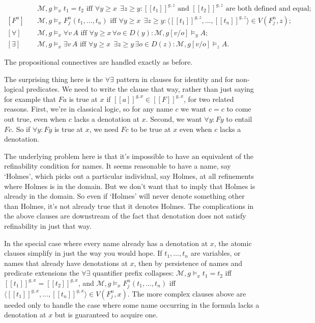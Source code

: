\documentclass[
  11pt,
  letterpaper,
  DIV=11,
  numbers=noendperiod,
  twoside]{scrartcl}
\newcommand{\llbracket}{[\![}
\newcommand{\rrbracket}{]\!]}
\begin{document}
\begin{align*}
[=] \quad & \mathcal{M}, g \models_x t_1 = t_2 \text{ iff } \forall y \geqslant x \;\, \exists z \geqslant y : \llbracket t_1 \rrbracket^{g,z} \text{ and } \llbracket t_2 \rrbracket^{g,z} \text{ are both defined and equal}; \\
[F^n] \quad & \mathcal{M}, g \models_x F^n_j(t_1, \dots, t_n) \text{ iff } \forall y \geqslant x \;\, \exists z \geqslant y : \langle \llbracket t_1 \rrbracket^{g,z}, \dots, \llbracket t_n \rrbracket^{g,z} \rangle \in V(F^n_j, z); \\
[\forall] \quad & \mathcal{M}, g \models_x \forall v \, A \text{ iff } \forall y \geqslant x \, \forall o \in D(y) : \mathcal{M}, g[v/o] \models_y A; \\
[\exists] \quad & \mathcal{M}, g \models_x  \exists v \, A \text{ iff } \forall y \geqslant x \;\, \exists z \geqslant y \, \exists o \in D(z) : \mathcal{M}, g[v/o] \models_z A.
\end{align*}

The propositional connectives are handled exactly as before.

The surprising thing here is the \(\forall\exists\) pattern in clauses
for identity and for non-logical predicates. We need to write the clause
that way, rather than just saying for example that \(Fa\) is true at
\(x\) if
\(\llbracket a \rrbracket^{g,x} \in \llbracket F \rrbracket^{g,x}\), for
two related reasons. First, we're in classical logic, so for any name
\(c\) we want \(c=c\) to come out true, even when \(c\) lacks a
denotation at \(x\). Second, we want \(\forall y: Fy\) to entail \(Fc\).
So if \(\forall y: Fy\) is true at \(x\), we need \(Fc\) to be true at
\(x\) even when \(c\) lacks a denotation.

The underlying problem here is that it's impossible to have an
equivalent of the refinability condition for names. It seems reasonable
to have a name, say `Holmes', which picks out a particular individual,
say Holmes, at all refinements where Holmes is in the domain. But we
don't want that to imply that Holmes is already in the domain. So even
if `Holmes' will never denote something other than Holmes, it's not
already true that it denotes Holmes. The complications in the above
clauses are downstream of the fact that denotation does not satisfy
refinability in just that way.

In the special case where every name already has a denotation at \(x\),
the atomic clauses simplify in just the way you would hope. If
\(t_1, \dots, t_n\) are variables, or names that already have
denotations at \(x\), then by persistence of names and predicate
extensions the \(\forall\exists\) quantifier prefix collapses:
\(\mathcal{M}, g \models_x t_1 = t_2\) iff
\(\llbracket t_1 \rrbracket^{g,x} = \llbracket t_2 \rrbracket^{g,x}\),
and \(\mathcal{M}, g \models_x F^n_j(t_1, \dots, t_n)\) iff
\(\langle \llbracket t_1 \rrbracket^{g,x}, \dots, \llbracket t_n \rrbracket^{g,x} \rangle \in V(F^n_j, x)\).
The more complex clauses above are needed only to handle the case where
some name occurring in the formula lacks a denotation at \(x\) but is
guaranteed to acquire one.
\end{document}
